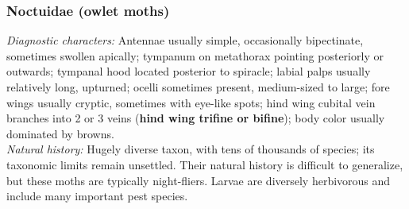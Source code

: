 \documentclass[letterpaper, 11pt]{article}
\begin{document}
\subsubsection{Noctuidae (owlet moths)}
\noindent{}\textit{Diagnostic characters:} Antennae usually simple, occasionally bipectinate, sometimes swollen apically; tympanum on metathorax pointing posteriorly or outwards; tympanal hood located posterior to spiracle; labial palps usually relatively long, upturned; ocelli sometimes present, medium-sized to large; fore wings usually cryptic, sometimes with eye-like  spots; hind wing cubital vein branches into 2 or 3 veins (\textbf{hind wing trifine or bifine}); body color usually dominated by browns.\\

\noindent{}\textit{Natural history:} Hugely diverse taxon, with tens of thousands of species; its taxonomic limits remain unsettled. Their natural history is difficult to generalize, but these moths are typically night-fliers. Larvae are diversely herbivorous and include many important pest species.
\end{document}
